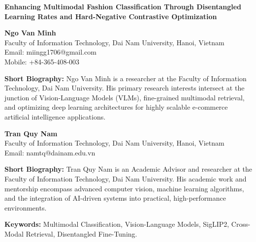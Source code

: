 \documentclass[12pt, a4paper]{article}
\begin{document}
\begin{titlepage}
\begin{center}
    \vspace*{1cm}
    \Large \textbf{Enhancing Multimodal Fashion Classification Through Disentangled Learning Rates and Hard-Negative Contrastive Optimization} \\
    \vspace{2cm}
    
    \large \textbf{Ngo Van Minh} \\
    \normalsize
    Faculty of Information Technology, Dai Nam University, Hanoi, Vietnam \\
    Email: miingg1706@gmail.com \\
    Mobile: +84-365-408-003 \\
    \vspace{0.3cm}
    \begin{minipage}{0.85\textwidth}
    \small \textbf{Short Biography:} Ngo Van Minh is a researcher at the Faculty of Information Technology, Dai Nam University. His primary research interests intersect at the junction of Vision-Language Models (VLMs), fine-grained multimodal retrieval, and optimizing deep learning architectures for highly scalable e-commerce artificial intelligence applications.
    \end{minipage}
    
    \vspace{1.5cm}
    
    \large \textbf{Tran Quy Nam} \\
    \normalsize
    Faculty of Information Technology, Dai Nam University, Hanoi, Vietnam \\
    Email: namtq@dainam.edu.vn \\
    \vspace{0.3cm}
    \begin{minipage}{0.85\textwidth}
    \small \textbf{Short Biography:} Tran Quy Nam is an Academic Advisor and researcher at the Faculty of Information Technology, Dai Nam University. His academic work and mentorship encompass advanced computer vision, machine learning algorithms, and the integration of AI-driven systems into practical, high-performance environments.
    \end{minipage}

    \vspace{2.5cm}
    
    \textbf{Keywords:} Multimodal Classification, Vision-Language Models, SigLIP2, Cross-Modal Retrieval, Disentangled Fine-Tuning.
    
\end{center}
\end{titlepage}
\end{document}

